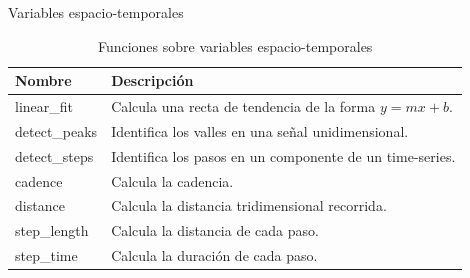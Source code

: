 \documentclass{beamer} %
\newcommand{\mono}[1]{{\ttfamily #1}}
\begin{document}
\begin{frame}{Variables espacio-temporales}
\begin{table}
    \centering
    \caption{Funciones sobre variables espacio-temporales}
    \label{tab:space-tmp}
    \scriptsize
    \begin{tabular}{ll}
        \toprule
        Nombre & Descripción \\
        \midrule
        \mono{linear\_fit} & Calcula una recta de tendencia de la forma $y = mx + b$. \\
        \mono{detect\_peaks} & Identifica los valles en una señal unidimensional. \\
        \mono{detect\_steps} & Identifica los pasos en un componente de un time-series. \\
        \mono{cadence} & Calcula la cadencia. \\
        \mono{distance} & Calcula la distancia tridimensional recorrida. \\
        \mono{step\_length} & Calcula la distancia de cada paso. \\
        \mono{step\_time} & Calcula la duración de cada paso. \\
        \bottomrule
    \end{tabular}
\end{table}
\end{frame}
\end{document}
